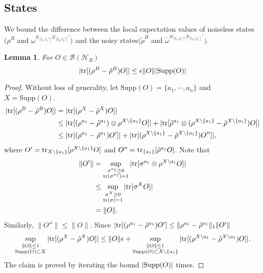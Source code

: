 \documentclass[prx,aps,amsmath,amssymb,floatfix,superscriptaddress,11pt,tightenlines,longbibliography,onecolumn,notitlepage]{revtex4-1}
\newcommand{\Tr}{\textnormal{tr}}
\newtheorem{lem}{Lemma}
\begin{document}
\subsection{States\label{section:states}}
We bound the difference between the local expectation values of noiseless states$(\rho^B$ and  $\omega^{S_{[t_1,t_1']}S_{[t_2,t_2']}'})$ and the noisy states$(\tilde{\rho}^B$ and $\tilde{\omega}^{S_{[t_1,t_1']}S_{[t_2,t_2']}'})$.
\begin{lem}
  For $O\in\mathcal{B}(\mathcal{H}_B)$
  \label{lemma:state_bath}
  \begin{equation}
    |\Tr[(\rho^B - \tilde{\rho}^B)O ]| \leq \epsilon \|O \| |\textnormal{Supp}(O)|
  \end{equation}
\end{lem}
\begin{proof}
  Without loss of generality, let $\text{Supp}(O)=\{a_1,\cdots, a_n \}$ and $X=\text{Supp}(O)$.
  \begin{equation}
    \begin{aligned}
      |\Tr[(\rho^B - \tilde{\rho}^B)O]| &=|\Tr[(\rho^X -  \tilde{\rho}^X ) O]| \\
      &\leq |\Tr[(\rho^{a_1}-\tilde{\rho}^{a_1})\otimes \rho^{X\setminus \{a_1 \}} O]|  + |\Tr[\tilde{\rho}^{a_1}\otimes(\rho^{X\setminus \{a_1 \}} - \tilde{\rho}^{X\setminus \{a_1 \}})O]| \\
      &\leq |\Tr[(\rho^{a_1} - \tilde{\rho}^{a_1})O']| + |\Tr[(\rho^{X\setminus \{a_1 \}} - \tilde{\rho}^{X\setminus \{a_1 \}})O'']|,
    \end{aligned}
  \end{equation}
  where $O'= \Tr_{X\setminus \{a_1\}}[\rho^{X\setminus\{a_1 \}}O]$ and $O'' = \Tr_{\{a_1\}}[\tilde{\rho}^{a_1} O]$. Note that
  \begin{equation}
    \begin{aligned}
      \|O' \| &=\sup_{\substack{\sigma^{a_1}\geq 0 \\ \Tr(\sigma^{a_1})=1}} |\Tr[\sigma^{a_1} \otimes \rho^{X\setminus a_1}O]|\\
      &\leq \sup_{\substack{\sigma^X\geq 0 \\ \Tr(\sigma)=1}} |\Tr[\sigma^X O]| \\
      &=\|O \|.
    \end{aligned}
  \end{equation}
Similarly, $\|O''\| \leq \| O \|$. Since $|\Tr[(\rho^{a_1}-\tilde{\rho}^{a_1})O']\leq \|\rho^{a_1} - \tilde{\rho}^{a_1}\|_1 \| O'\|$
\begin{equation}
    \sup_{\substack{\|O \|\leq 1\\ \text{Supp}(O) \subset X}}|\Tr[(\rho^X - \tilde{\rho}^X)O]| \leq \|O\|\epsilon + \sup_{\substack{\|O \|\leq 1 \\ \text{Supp}(O)\subset X\setminus \{a_1\} }} |\Tr[(\rho^{X\setminus a_1} - \tilde{\rho}^{X\setminus a_1}) O]|.
\end{equation}
The claim is proved by iterating the bound $|\textnormal{Supp}(O)|$ times.
 \end{proof}
\end{document}
